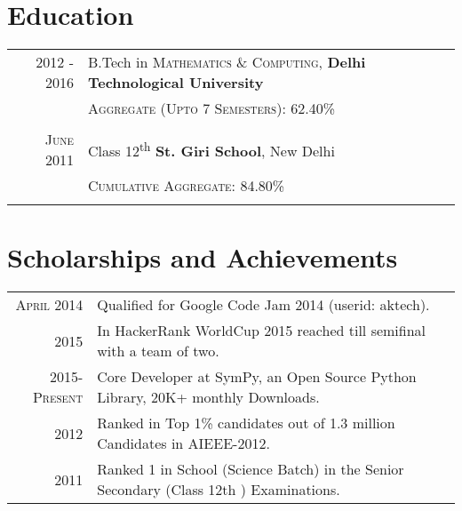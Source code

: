 \documentclass[a4paper,10pt]{article}
\begin{document}
\section{Education}
\begin{tabular}{rl}	
 \textsc{2012} - 2016 & B.Tech in \textsc{Mathematics \& Computing}, \textbf{Delhi Technological University}\\
&\normalsize \textsc{Aggregate (Upto 7 Semesters)}: 62.40\%\\&\\

\textsc{June} 2011& Class 12\textsuperscript{th} \textbf{St. Giri School}, New Delhi\\
&\normalsize \textsc{Cumulative Aggregate}: 84.80\%\\&\\

\end{tabular}

\section{Scholarships and Achievements}
\begin{tabular}{rl}
 \textsc{April} 2014 & Qualified for Google Code Jam 2014 (userid: aktech).\\
 \textsc{2015} & In HackerRank WorldCup 2015 reached till semifinal with a team of two.\\
 \textsc{2015-Present} & Core Developer at SymPy, an Open Source Python Library, 20K+ monthly Downloads.\\
 \textsc{2012} & Ranked in Top 1\% candidates out of 1.3 million Candidates in AIEEE-2012.\\
 \textsc{2011} & Ranked 1 in School (Science Batch) in the Senior Secondary (Class 12th ) Examinations.\\
\end{tabular}

\end{document}
